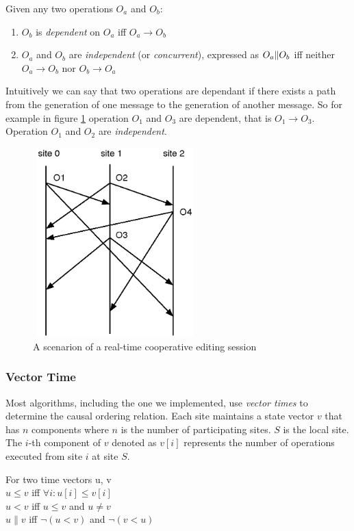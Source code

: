 Given any two operations $O_{a}$ and $O_{b}$:
\begin{enumerate}
 \item $O_{b}$ is \emph{dependent} on $O_{a}$ iff $O_{a} \rightarrow O_{b}$
 \item $O_{a}$ and $O_{b}$ are \emph{independent} (or \emph{concurrent}), 
       expressed as $O_{a} \Arrowvert O_{b}$ iff neither 
       $O_{a}\rightarrow O_{b}$ nor $O_{b}\rightarrow O_{a}$
\end{enumerate}

Intuitively we can say that two operations are dependant if there exists a path from the generation of one message to the generation of another message. So for example in figure \ref{fig:example1} operation $O_{1}$ and $O_{3}$ are dependent, that is $O_{1}\rightarrow O_{3}$. Operation $O_{1}$ and $O_{2}$ are \emph{independent}. 

\begin{figure}
 \centering
 \includegraphics[width=2.5in,height=2.88in]{../images/finalreport/example1.eps}
 \caption{A scenarion of a real-time cooperative editing session}
 \label{fig:example1}
\end{figure}

\subsubsection{Vector Time}
Most algorithms, including the one we implemented,
use \emph{vector times} to determine the causal ordering relation. Each site
maintains a state vector $v$ that has $n$ components where $n$ is the number of 
participating sites. $S$ is the local site. The $i$-th component of $v$ denoted 
as $v[i]$ represents the number of operations executed from site $i$ at site 
$S$. 

\begin{defn}
  For two time vectors u, v \\
  $u \leq v$ iff $\forall i : u[i] \leq v[i]$ \\
  $u < v$ iff $u \leq v$ and $u \not= v$ \\
  $u \parallel v$ iff $\neg(u < v)$ and $\neg(v < u)$
\end{defn}

